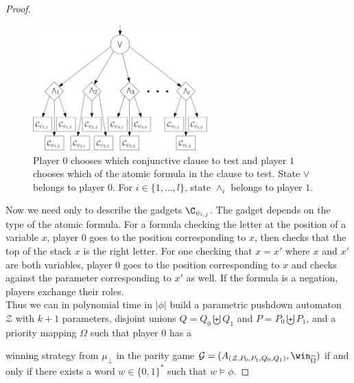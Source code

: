 \begin{proof}
\begin{center}
	\begin{figure}
		\hspace{2.4cm}
\includegraphics[width=0.6\textwidth]{figures/DNF}
	\caption{Player $0$ chooses which conjunctive clause to test and player $1$ chooses which of the atomic formula in the clause to test. State $\vee$ belongs to player $0$. For $i \in \{1, \ldots, l\}$, state $\wedge_i$ belongs to player $1$.}
		 \label{DNF}
	\end{figure}
\end{center}


Now we need only to describe the gadgets $ \C_{\psi_{i,j}}$. 
The gadget depends on the type of the atomic formula. For a formula checking the letter at the position of a variable $x$, player $0$ goes to the position corresponding to $x$, then checks that the top of the stack
$x$ is the right letter. For one checking that $x = x'$ where $x$ and $x'$ are both variables,
player $0$ goes to the position corresponding to $x$ and checks against the parameter corresponding to $x'$ as well. If the formula is a negation, players exchange their roles. \\






\noindent
Thus we can in polynomial time in $|\phi|$ build a parametric pushdown automaton $\mathcal{Z}$ with $k+1$ parameters, 
 disjoint
unions $Q = Q_0  \biguplus Q_1 $ and $P = P_0 \biguplus P_1$,
and a priority mapping $\Omega$
such that
player $0$ has a 

		winning strategy from $\mu_\bot$ in the parity game
		$\mathcal{G} =(A_{(\mathcal{Z}, P_0, P_1, Q_0 , Q_1)}, \win_{\widehat{\Omega}})$ 
if and only if
there exists
a word $w \in \{0,1\}^*$ such that
$w \models \phi$.
\end{proof}

